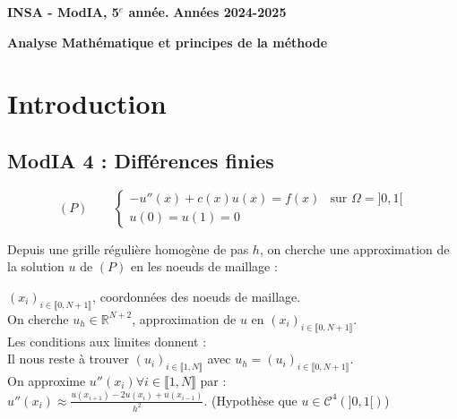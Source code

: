 \documentclass[12pt,a4paper]{article}
\newcommand{\entete}{
    \noindent\textbf{INSA - ModIA, 5$^e$ année.}
    \hfill \textbf{Années 2024-2025}
    
    \begin{center}
        \textbf{\LARGE Analyse Mathématique et principes de la méthode}
    \end{center}
}
\begin{document}
\entete

\vspace{0.5cm}

\section{Introduction}

\subsection{ModIA 4 : Différences finies }

\begin{equation}
    (P) \qquad
    \begin{cases}
        -u''(x) + c(x)u(x) = f(x) & \text{sur } \Omega = ]0,1[ \\
        u(0) = u(1) = 0
    \end{cases}
    \label{eq:P}
\end{equation}

Depuis une grille régulière homogène de pas $h$, on cherche une approximation de la solution $u$ de $(P)$ en les noeuds de maillage : \\



$(x_i)_{i \in \llbracket 0, N + 1 \rrbracket}$, coordonnées des noeuds de maillage. \\

On cherche $u_h \in \mathbb{R}^{N+2}$, approximation de $u$ en $(x_i)_{i \in \llbracket 0, N + 1 \rrbracket}$. \\
Les conditions aux limites donnent : 
\\

Il nous reste à trouver $(u_i)_{i \in \llbracket 1, N \rrbracket}$ avec $u_h = (u_i)_{i \in \llbracket 0, N + 1 \rrbracket}$. \\


On approxime $u''(x_i) \forall i \in \llbracket 1, N \rrbracket$ par : \\
$u''(x_i) \approx \frac{u(x_{i+1}) - 2u(x_i) + u(x_{i-1})}{h^2}$. (Hypothèse que $u \in \mathcal{C}^4(]0, 1[)$) \\
\end{document}
